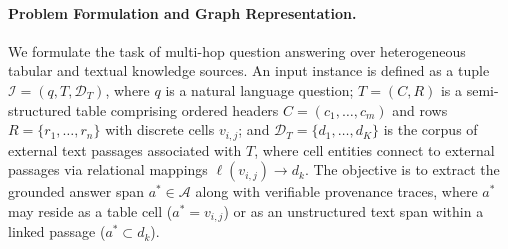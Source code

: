 \documentclass[runningheads]{llncs}
\begin{document}
\paragraph{Problem Formulation and Graph Representation.}
\label{sec:formulation}
We formulate the task of multi-hop question answering over heterogeneous tabular and textual knowledge sources. An input instance is defined as a tuple $\mathcal{I} = (q, T, \mathcal{D}_T)$, where $q$ is a natural language question; $T = (C, R)$ is a semi-structured table comprising ordered headers $C = (c_1, \dots, c_m)$ and rows $R = \{r_1, \dots, r_n\}$ with discrete cells $v_{i,j}$; and $\mathcal{D}_T = \{d_1, \dots, d_K\}$ is the corpus of external text passages associated with $T$, where cell entities connect to external passages via relational mappings $\ell(v_{i,j}) \rightarrow d_k$. The objective is to extract the grounded answer span $a^* \in \mathcal{A}$ along with verifiable provenance traces, where $a^*$ may reside as a table cell ($a^* = v_{i,j}$) or as an unstructured text span within a linked passage ($a^* \subset d_k$).
\end{document}
